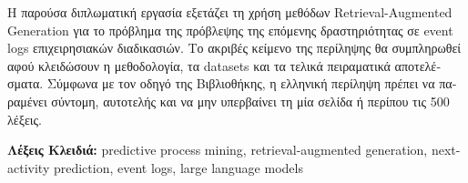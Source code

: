 \begin{otherlanguage}{greek}
\justifying
{}

\noindent
Η παρούσα διπλωματική εργασία εξετάζει τη χρήση μεθόδων Retrieval-Augmented Generation για το πρόβλημα της πρόβλεψης της επόμενης δραστηριότητας σε event logs επιχειρησιακών διαδικασιών. Το ακριβές κείμενο της περίληψης θα συμπληρωθεί αφού κλειδώσουν η μεθοδολογία, τα datasets και τα τελικά πειραματικά αποτελέσματα. Σύμφωνα με τον οδηγό της Βιβλιοθήκης, η ελληνική περίληψη πρέπει να παραμένει σύντομη, αυτοτελής και να μην υπερβαίνει τη μία σελίδα ή περίπου τις 500 λέξεις.

\vspace{1cm}
\flushleft \textbf{Λέξεις Κλειδιά:} predictive process mining, retrieval-augmented generation, next-activity prediction, event logs, large language models
\end{otherlanguage}
\blankpage
